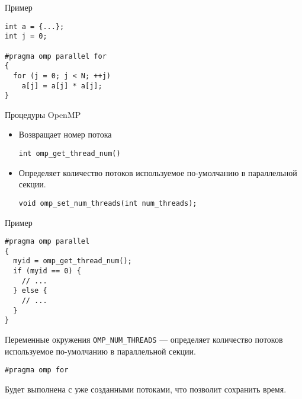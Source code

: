 \begin{frame}[fragile]{Пример}

\begin{lstlisting}
int a = {...};
int j = 0;

#pragma omp parallel for
{
  for (j = 0; j < N; ++j)
    a[j] = a[j] * a[j];
}
\end{lstlisting}

\end{frame}

\begin{frame}[fragile]{Процедуры OpenMP}

\begin{itemize}
    \item Возвращает номер потока
    \begin{lstlisting}
int omp_get_thread_num()
    \end{lstlisting}

    \item Определяет количество потоков используемое по-умолчанию в параллельной секции.
    \begin{lstlisting}
void omp_set_num_threads(int num_threads);
    \end{lstlisting}
\end{itemize}

\end{frame}

\begin{frame}[fragile]{Пример}

\begin{lstlisting}
#pragma omp parallel
{
  myid = omp_get_thread_num();
  if (myid == 0) {
    // ...
  } else {
    // ...
  }
}
\end{lstlisting}

\end{frame}

\begin{frame}{Переменные окружения}
\texttt{OMP_NUM_THREADS} --- определяет количество потоков используемое по-умолчанию в параллельной секции.
\end{frame}

\begin{frame}[fragile]

\begin{lstlisting}
#pragma omp for
\end{lstlisting}

Будет выполнена с уже созданными потоками, что позволит сохранить время.

\end{frame}

